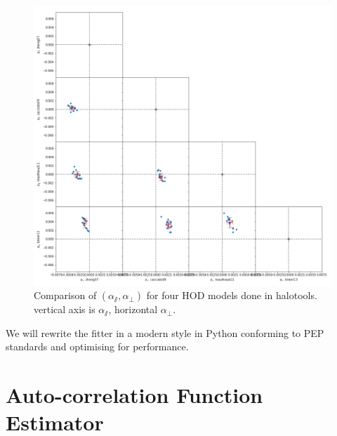 \documentclass[fleqn,usenatbib]{mnras}
\begin{document}
	\begin{figure}
		\includegraphics[width=\linewidth]{alpha_pair_compare.png}
	    \caption{Comparison of $ (\alpha_\varparallel, \alpha_\perp) $ for four HOD models done in halotools. vertical axis is $\alpha_\varparallel$, horizontal $\alpha_\perp$. }
	    \label{fig:alpha_hod_compare}
	\end{figure}
	
	We will rewrite the fitter in a modern style in Python conforming to PEP standards and optimising for performance.








\appendix

\section{Auto-correlation Function Estimator}
	\label{appendix_auto_correlation}
	
\end{document}
